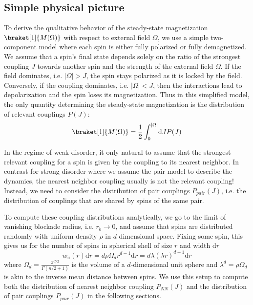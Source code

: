 \subsection{Simple physical picture}\label{sec:cusp-round-sharp}
To derive the qualitative behavior of the steady-state magnetization $\braket[1]{M(\Omega)}$ with respect to external field $\Omega$, we use a simple two-component model where each spin is either fully polarized or fully demagnetized. We assume that a spin's final state depends solely on the ratio of the strongest coupling $J$ towards another spin and the strength of the external field $\Omega$. If the field dominates, i.e. $|\Omega| > J$, the spin stays polarized as it is locked by the field. Conversely, if the coupling dominates, i.e. $|\Omega| < J$, then the interactions lead to depolarization and the spin loses its magnetization. Thus in this simplified model, the only quantity determining the steady-state magnetization is the distribution of relevant couplings $P(J)$:
\begin{equation}\label{eq:Cusp-simple-model-magnetization}
	\braket[1]{M(\Omega)} = \frac{1}{2}\int_0^{|\Omega|}\!\mathrm{d}J P(J)
\end{equation}

In the regime of weak disorder, it only natural to assume that the strongest relevant coupling for a spin is given by the coupling to its nearest neighbor. In contrast for strong disorder where we assume the pair model to describe the dynamics, the nearest neighbor coupling usually is not the relevant coupling! Instead, we need to consider the distribution of pair couplings $P_{pair}(J)$, i.e. the distribution of couplings that are shared by spins of the same pair.

To compute these coupling distributions analytically, we go to the limit of vanishing blockade radius, i.e. $r_b\rightarrow 0$, and assume that spins are distributed randomly with uniform density $\rho$ in $d$ dimensional space. Fixing some spin, this gives us for the number of spins in spherical shell of size $r$ and width $\mathrm{d}r$
\begin{equation}\label{eq:uniform-spin-distribution}
	w_u(r)\mathrm{d}r = d \rho \Omega_d r^{d-1}\mathrm{d}r = d\lambda (\lambda r)^{d-1}\mathrm{d}r
\end{equation}
where $\Omega_d = \frac{\pi^{d/2}}{\Gamma(n/2+1)}$ is the volume of a $d$-dimensional unit sphere and $\lambda^d = \rho \Omega_d$ is akin to the inverse mean distance between spins. We use this setup to compute both the distribution of nearest neighbor coupling $P_{NN}(J)$ and the distribution of pair couplings $P_{pair}(J)$ in the following sections.

